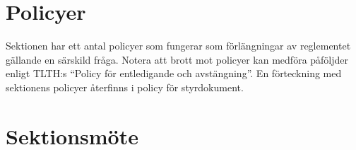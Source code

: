 \documentclass[pdfbookmarks,a4paper,11pt]{article}
\newlength{\itemcollength}
\newenvironment{reglemlista}{%
  \begin{list}{}{%
      \setlength{\labelwidth}{\itemcollength}%
      \setlength{\leftmargin}{\labelwidth + \labelsep}%
      \renewcommand{\makelabel}[1]{%
        \raisebox{0pt}[1ex][0pt]{%
          \makebox[\labelwidth][l]{%
            \parbox[t]{\itemcollength}{%
              \raggedright\hspace{0pt}##1}}}\hfill}%
      }}{%
  \end{list}}
\begin{document}
\section{Policyer}

\begin{reglemlista}
	\item[Policyer]
    Sektionen har ett antal policyer som fungerar som förlängningar av reglementet gällande en särskild fråga. Notera att brott mot policyer kan medföra påföljder enligt TLTH:s “Policy för entledigande och avstängning”. En förteckning med sektionens policyer återfinns i policy för styrdokument.
\end{reglemlista}


\section{Sektionsmöte}
\end{document}
